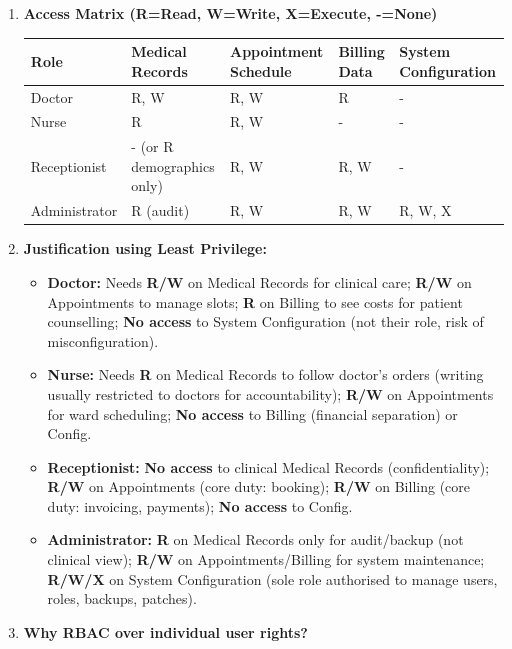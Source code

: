 \documentclass[11pt]{article}
\begin{document}
\begin{corrige}
\begin{enumerate}
\item \textbf{Access Matrix (R=Read, W=Write, X=Execute, -=None)}
\begin{center}
\begin{tabularx}{\linewidth}{|l|X|X|X|X|}
\hline
\rowcolor{popblueL} \textbf{Role} & \textbf{Medical Records} & \textbf{Appointment Schedule} & \textbf{Billing Data} & \textbf{System Configuration} \\
\hline
Doctor & R, W & R, W & R & - \\
\hline
Nurse & R & R, W & - & - \\
\hline
Receptionist & - (or R demographics only) & R, W & R, W & - \\
\hline
Administrator & R (audit) & R, W & R, W & R, W, X \\
\hline
\end{tabularx}
\end{center}
\item \textbf{Justification using Least Privilege:}
\begin{itemize}
\item \textbf{Doctor:} Needs \textbf{R/W} on Medical Records for clinical care; \textbf{R/W} on Appointments to manage slots; \textbf{R} on Billing to see costs for patient counselling; \textbf{No access} to System Configuration (not their role, risk of misconfiguration).
\item \textbf{Nurse:} Needs \textbf{R} on Medical Records to follow doctor's orders (writing usually restricted to doctors for accountability); \textbf{R/W} on Appointments for ward scheduling; \textbf{No access} to Billing (financial separation) or Config.
\item \textbf{Receptionist:} \textbf{No access} to clinical Medical Records (confidentiality); \textbf{R/W} on Appointments (core duty: booking); \textbf{R/W} on Billing (core duty: invoicing, payments); \textbf{No access} to Config.
\item \textbf{Administrator:} \textbf{R} on Medical Records only for audit/backup (not clinical view); \textbf{R/W} on Appointments/Billing for system maintenance; \textbf{R/W/X} on System Configuration (sole role authorised to manage users, roles, backups, patches).
\end{itemize}
\item \textbf{Why RBAC over individual user rights?}
\begin{enumerate}

\end{enumerate}
\end{enumerate}
\end{corrige}
\end{document}
